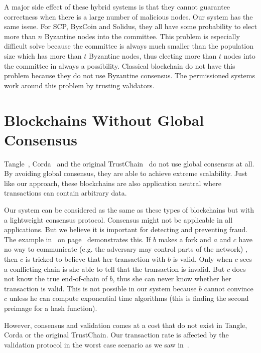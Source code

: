 A major side effect of these hybrid systems is that they cannot guarantee correctness when there is a large number of malicious nodes.
Our system has the same issue.
For SCP, ByzCoin and Solidus, they all have some probability to elect more than $n$ Byzantine nodes into the committee.
This problem is especially difficult solve because the committee is always much smaller than the population size which has more than $t$ Byzantine nodes,
thus electing more than $t$ nodes into the committee in always a possibility.
Classical blockchain do not have this problem because they do not use Byzantine consensus.
The permissioned systems work around this problem by trusting validators.

\section{Blockchains Without Global Consensus}

Tangle~\cite{tangle}, Corda~\cite{corda} and the original TrustChain~\cite{trustchain} do not use global consensus at all.
By avoiding global consensus, they are able to achieve extreme scalability.
Just like our approach, these blockchains are also application neutral where transactions can contain arbitrary data.

Our system can be considered as the same as these types of blockchains but with a lightweight consensus protocol.
Consensus might not be applicable in all applications.
But we believe it is important for detecting and preventing fraud.
The example in~ on page~\pageref{fig:trustchain-bad} demonstrates this.
If $b$ makes a fork and $a$ and $c$ have no way to communicate (e.g. the adversary may control parts of the network) ,
then $c$ is tricked to believe that her transaction with $b$ is valid.
Only when $c$ sees a conflicting chain is she able to tell that the transaction is invalid.
But $c$ does not know the true end-of-chain of $b$, thus she can never know whether her transaction is valid.
This is not possible in our system because $b$ cannot convince $c$ unless he can compute exponential time algorithms
(this is finding the second preimage for a hash function).

However, consensus and validation comes at a cost that do not exist in Tangle, Corda or the original TrustChain.
Our transaction rate is affected by the validation protocol in the worst case scenario as we saw in~.

